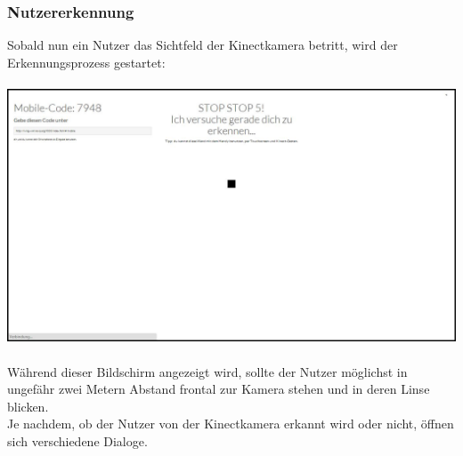 \documentclass[10pt,a4paper]{report}
\begin{document}
		\subsubsection{Nutzererkennung}
		Sobald nun ein Nutzer das Sichtfeld der Kinectkamera betritt, wird der Erkennungsprozess gestartet:\\\\
		\includegraphics[scale=0.31]{Erkennung}\\\\
		Während dieser Bildschirm angezeigt wird, sollte der Nutzer möglichst in ungefähr zwei Metern Abstand frontal zur Kamera stehen und in deren Linse blicken.\\
Je nachdem, ob der Nutzer von der Kinectkamera erkannt wird oder nicht, öffnen sich verschiedene Dialoge.
\end{document}
